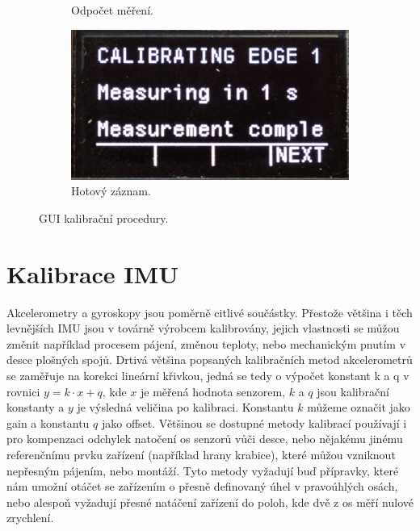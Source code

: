 \begin{figure}[h]
\begin{subfigure}[b]{0.24\textwidth}
         \caption{Odpočet měření.}     
     \end{subfigure}
     \hfill
     \centering
     \begin{subfigure}[b]{0.24\textwidth}
         \centering
         \includegraphics[width=\textwidth]{obrazky/menuCAL4}
         \caption{Hotový záznam.}   
     \end{subfigure}

        \caption{GUI kalibrační procedury.}
        \label{fig:calibrationGUI}
\end{figure}

\section{Kalibrace IMU} \label{calibrationALG}
Akcelerometry a gyroskopy jsou poměrně citlivé součástky. Přestože většina i těch levnějších IMU jsou v továrně výrobcem kalibrovány, jejich vlastnosti se můžou změnit například procesem pájení, změnou teploty, nebo mechanickým pnutím v desce plošných spojů. Drtivá většina popsaných kalibračních metod akcelerometrů se zaměřuje na korekci lineární křivkou, jedná se tedy o výpočet konstant k a q v rovnici $ y=k\cdot x + q $, kde $ x $ je měřená hodnota senzorem, $ k $ a $ q $ jsou kalibrační konstanty a $ y $ je výsledná veličina po kalibraci. Konstantu $ k $ můžeme označit jako gain a konstantu $ q $ jako offset. Většinou se dostupné metody kalibrací používají i pro kompenzaci odchylek natočení os senzorů vůči desce, nebo nějakému jinému referenčnímu prvku zařízení (například hrany krabice), které můžou vzniknout nepřesným pájením, nebo montáží. Tyto metody vyžadují buď přípravky, které nám umožní otáčet se zařízením o přesně definovaný úhel v pravoúhlých osách, nebo alespoň vyžadují přesné natáčení zařízení do poloh, kde dvě z os měří nulové zrychlení. \cite{eUM5mr8dMf0LyseX} \cite{6yeG6wAI1hTfmXJK}

